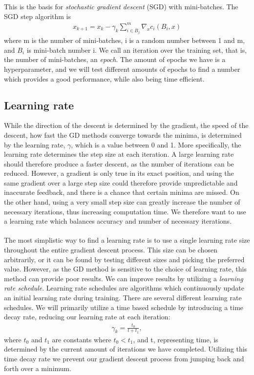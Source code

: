 \documentclass[english,notitlepage,reprint,nofootinbib]{revtex4-1}  %
\begin{document}
This is the basis for \textit{stochastic gradient descent} (SGD) with mini-batches. The SGD step algorithm is 
\begin{align}
    x_{k+1} = x_{k} - \gamma_{k} \sum_{i \in B_{j}}^{m} \nabla_{x} c_{i}(B_{i}, x)
\end{align}
where m is the number of mini-batches, i is a random number between 1 and m, and $B_{i}$ is mini-batch number i. We call an iteration over the training set, that is, the number of mini-batches, an \textit{epoch}. The amount of epochs we have is a hyperparameter, and we will test different amounts of epochs to find a number which provides a good performance, while also being time efficient. 


\subsection{Learning rate}
While the direction of the descent is determined by the gradient, the speed of the descent, how fast the GD methods converge towards the minima, is determined by the learning rate, $\gamma$, which is a value between 0 and 1. More specifically, the learning rate determines the step size at each iteration. A large learning rate should therefore produce a faster descent, as the number of iterations can be reduced. However, a gradient is only true in its exact position, and using the same gradient over a large step size could therefore provide unpredictable and inaccurate feedback, and there is a chance that certain minima are missed.
On the other hand, using a very small step size can greatly increase the number of necessary iterations, thus increasing computation time. We therefore want to use a learning rate which balances accuracy and number of necessary iterations. %
\\
\\
The most simplistic way to find a learning rate is to use a single learning rate size throughout the entire gradient descent process. This size can be chosen arbitrarily, or it can be found by testing different sizes and picking the preferred value. However, as the GD method is sensitive to the choice of learning rate, this method can provide poor results. We can improve results by utilizing a \textit{learning rate schedule}. Learning rate schedules are algorithms which continuously update an initial learning rate during training. There are several different learning rate schedules. %
We will primarily utilize a time based schedule by introducing a time decay rate, reducing our learning rate at each iteration:
\begin{align}
    \gamma_{k} = \frac{t_{0}}{t + t_{1}},
\end{align}
where $t_{0}$ and $t_{1}$ are constants where $t_{0} < t_{1}$, and t, representing time, is determined by the current amount of iterations we have completed. %
Utilizing this time decay rate we prevent our gradient descent process from jumping back and forth over a minimum.
\\
\end{document}
